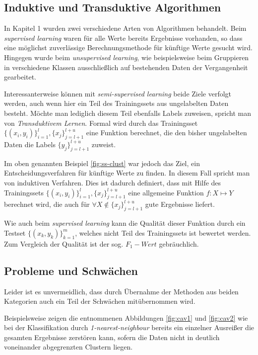 \documentclass[runningheads,a4paper]{llncs}
\begin{document}
\subsection{Induktive und Transduktive Algorithmen}

In Kapitel 1 wurden zwei verschiedene Arten von Algorithmen behandelt. Beim \emph{supervised learning} waren für alle Werte bereits Ergebnisse vorhanden, so dass eine möglichst zuverlässige Berechnungsmethode für künftige Werte gesucht wird. 
Hingegen wurde beim \emph{unsupervised learning}, wie beispielsweise beim Gruppieren in verschiedene Klassen ausschließlich auf bestehenden Daten der Vergangenheit gearbeitet.

Interessanterweise können mit \emph{semi-supervised learning} beide Ziele verfolgt werden, auch wenn hier ein Teil des Trainingssets aus ungelabelten Daten besteht. Möchte man lediglich diesem Teil ebenfalls Labels zuweisen, spricht man von \emph{Transduktivem Lernen}. Formal wird durch das Trainingsset $\{(x_i, y_i)\}_{i=1}^l, \{x_j\}_{j=l+1}^{l+u}$ eine Funktion berechnet, die den bisher ungelabelten Daten die Labels $\{y_j\}_{j=l+1}^{l+u}$ zuweist.

Im oben genannten Beispiel \ref{fig:ss-clust} war jedoch das Ziel, ein Entscheidungsverfahren für künftige Werte zu finden. In diesem Fall spricht man von induktiven Verfahren. Dies ist dadurch definiert, dass mit Hilfe des Trainingssets $\{(x_i, y_i)\}_{i=1}^l, \{x_j\}_{j=l+1}^{l+u}$ eine allgemeine Funktion $f : X \mapsto Y$ berechnet wird, die auch für $\forall X \notin \{x_j\}_{j=l+1}^{l+u}$ gute Ergebnisse liefert.

Wie auch beim \emph{supervised learning} kann die Qualität dieser Funktion durch ein Testset $\{(x_k, y_k)\}_{k=1}^m$, welches nicht Teil des Trainingssets ist bewertet werden. Zum Vergleich der Qualität ist der sog. $F_1-Wert$ gebräuchlich.\cite{zhu_goldberg_2009}



\subsection{Probleme und Schwächen}

Leider ist es unvermeidlich, dass durch Übernahme der Methoden aus beiden Kategorien auch ein Teil der Schwächen mitübernommen wird. 

Beispielsweise zeigen die \cite{zhu_goldberg_2009} entnommenen Abbildungen \ref{fig:cav1} und \ref{fig:cav2} wie bei der Klassifikation durch \emph{1-nearest-neighbour} bereits ein einzelner Ausreißer die gesamten Ergebnisse zerstören kann, sofern die Daten nicht in deutlich voneinander abgegrenzten Clustern liegen.
\end{document}
